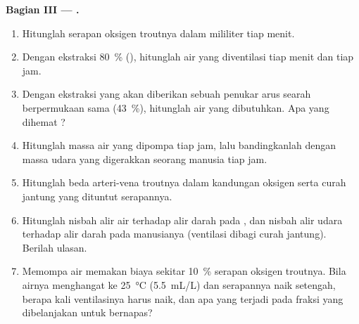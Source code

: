 \begin{problem}
\medskip
\noindent\textbf{Bagian III --- .}
\begin{enumerate}[resume]
  \item Hitunglah serapan oksigen troutnya dalam mililiter tiap menit.
  \item Dengan ekstraksi \qty{80}{\%} (), hitunglah air yang
        diventilasi tiap menit dan tiap jam.
  \item Dengan ekstraksi yang akan diberikan sebuah penukar arus
        searah berpermukaan sama (\qty{43}{\%}), hitunglah air yang
        dibutuhkan. Apa yang dihemat ?
  \item Hitunglah massa air yang dipompa tiap jam, lalu bandingkanlah
        dengan massa udara yang digerakkan seorang manusia tiap jam.
  \item Hitunglah beda arteri-vena troutnya dalam kandungan oksigen
        serta curah jantung yang dituntut serapannya.
  \item Hitunglah nisbah alir air terhadap alir darah pada ,
        dan nisbah alir udara terhadap alir darah pada 
        manusianya (ventilasi  dibagi curah jantung).
        Berilah ulasan.
  \item Memompa air memakan biaya sekitar \qty{10}{\%} serapan oksigen
        troutnya. Bila airnya menghangat ke \qty{25}{\celsius}
        (\qty{5.5}{mL/L}) dan serapannya naik setengah, berapa kali
        ventilasinya harus naik, dan apa yang terjadi pada fraksi yang
        dibelanjakan untuk bernapas?
\end{enumerate}


\end{problem}
